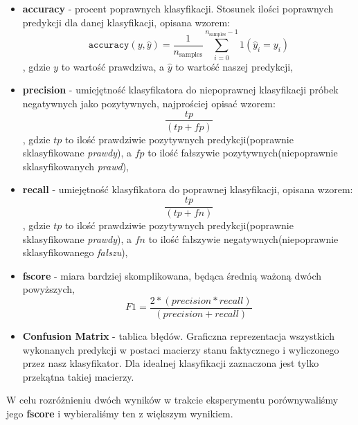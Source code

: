 	\begin{itemize}
		\item \textbf{accuracy} - procent poprawnych klasyfikacji. Stosunek ilości poprawnych predykcji dla danej klasyfikacji, opisana wzorem:
		\[\texttt{accuracy}(y, \hat{y}) = \frac{1}{n_\text{samples}} \sum_{i=0}^{n_\text{samples}-1} 1(\hat{y}_i = y_i)\]
		, gdzie $y$ to wartość prawdziwa, a $\hat{y}$ to wartość naszej predykcji,
		\item \textbf{precision} - umiejętność klasyfikatora do niepoprawnej klasyfikacji próbek negatywnych jako pozytywnych, najprościej opisać wzorem:
		\[ \frac{tp}{(tp + fp)}\] 
		, gdzie $tp$ to ilość prawdziwie pozytywnych predykcji(poprawnie sklasyfikowane \textit{prawdy}), a $fp$ to ilość fałszywie pozytywnych(niepoprawnie sklasyfikowanych \textit{prawd}),
		\item \textbf{recall} - umiejętność klasyfikatora do poprawnej klasyfikacji, opisana wzorem:
		\[ \frac{tp}{(tp + fn)}\]
		, gdzie $tp$ to ilość prawdziwie pozytywnych predykcji(poprawnie sklasyfikowane \textit{prawdy}), a $fn$ to ilość fałszywie negatywnych(niepoprawnie sklasyfikowanego \textit{fałszu}),
		\item \textbf{fscore} - miara bardziej skomplikowana, będąca średnią ważoną dwóch powyższych,
		\[F1 = \frac{2 * (precision * recall)}{ (precision + recall)} \] 
		\item \textbf{Confusion Matrix} - tablica błędów. Graficzna reprezentacja wszystkich wykonanych predykcji w postaci macierzy stanu faktycznego i wyliczonego przez nasz klasyfikator. Dla idealnej klasyfikacji zaznaczona jest tylko przekątna takiej macierzy.
	\end{itemize}

	W celu rozróżnieniu dwóch wyników w trakcie eksperymentu porównywaliśmy jego \textbf{fscore} i wybieraliśmy ten z większym wynikiem.